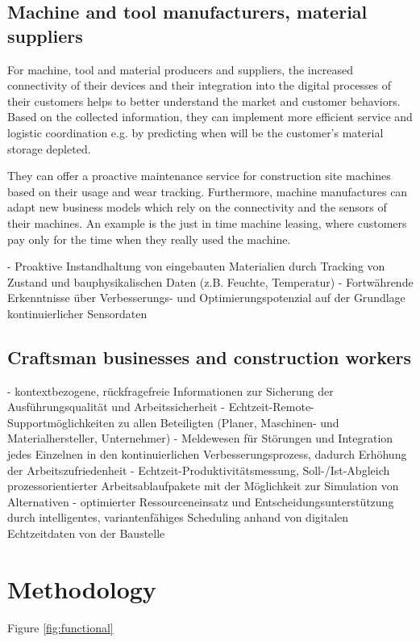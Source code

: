 \subsection{Machine and tool manufacturers, material suppliers}
For machine, tool and material producers and suppliers, the increased connectivity of their devices and their integration into the digital processes of their customers helps to better understand the market and customer behaviors. 
Based on the collected information, they can implement more efficient service and logistic coordination e.g. by predicting when will be the customer's material storage depleted.

They can offer a proactive maintenance service for construction site machines based on their usage and wear tracking. 
Furthermore, machine manufactures can adapt new business models which rely on the connectivity and the sensors of their machines. An example is the just in time machine leasing, where customers pay only for the time when they really used the machine.


- Proaktive Instandhaltung von eingebauten Materialien durch Tracking von Zustand und bauphysikalischen Daten (z.B. Feuchte, Temperatur) 
- Fortwährende Erkenntnisse über Verbesserungs- und Optimierungspotenzial auf der Grundlage kontinuierlicher Sensordaten


\subsection{Craftsman businesses and construction workers}
- kontextbezogene, rückfragefreie Informationen zur Sicherung der Ausführungsqualität und Arbeitssicherheit
- Echtzeit-Remote-Supportmöglichkeiten zu allen Beteiligten (Planer, Maschinen- und Materialhersteller, Unternehmer)
- Meldewesen für Störungen und Integration jedes Einzelnen in den kontinuierlichen Verbesserungsprozess, dadurch Erhöhung der Arbeitszufriedenheit
- Echtzeit-Produktivitätsmessung, Soll-/Ist-Abgleich prozessorientierter Arbeitsablaufpakete mit der Möglichkeit zur Simulation von Alternativen
- optimierter Ressourceneinsatz und Entscheidungsunterstützung durch intelligentes, variantenfähiges Scheduling anhand von digitalen Echtzeitdaten von der Baustelle


\section{Methodology}
Figure \ref{fig:functional}

